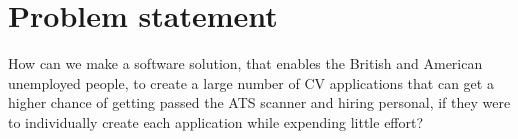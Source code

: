 \section{Problem statement}\label{sec:problem}
How can we make a software solution, 
that enables the British and American unemployed people, to create a large number of CV applications that can get 
a higher chance of getting passed the ATS scanner and hiring personal, 
if they were to individually create each application while expending little effort?